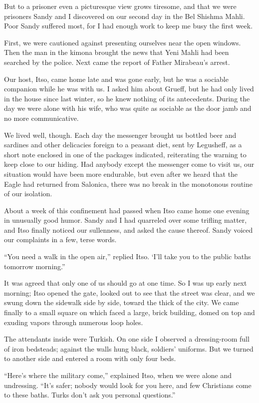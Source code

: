\documentclass[a5paper,12pt]{book}
\begin{document}
But to a prisoner even a picturesque view grows tiresome, and that we were prisoners Sandy and I discovered on our second day in the Bel Shishma Mahli. Poor Sandy suffered most, for I had enough work to keep me busy the first week.

First, we were cautioned against presenting ourselves near the open windows. Then the man in the kimona brought the news that Yeni Mahli had been searched by the police. Next came the report of Father Mirabeau’s arrest.

Our host, Itso, came home late and was gone early, but he was a sociable companion while he was with us. I asked him about Grueff, but he had only lived in the house since last winter, so he knew nothing of its antecedents. During the day we were alone with his wife, who was quite as sociable as the door jamb and no more communicative.

We lived well, though. Each day the messenger brought us bottled beer and sardines and other delicacies foreign to a peasant diet, sent by Legusheff, as a short note enclosed in one of the packages indicated, reiterating the warning to keep close to our hiding. Had anybody except the messenger come to visit us, our situation would have been more endurable, but even after we heard that the Eagle had returned from Salonica, there was no break in the monotonous routine of our isolation.

About a week of this confinement had passed when Itso came home one evening in unusually good humor. Sandy and I had quarreled over some trifling matter, and Itso finally noticed our sullenness, and asked the cause thereof. Sandy voiced our complaints in a few, terse words.

“You need a walk in the open air,” replied Itso. ‘I'll take you to the public baths tomorrow morning.”

It was agreed that only one of us should go at one time. So I was up early next morning; Itso opened the gate, looked out to see that the street was clear, and we swung down the sidewalk side by side, toward the thick of the city. We came finally to a small square on which faced a large, brick building, domed on top and exuding vapors through numerous loop holes.

The attendants inside were Turkish. On one side I observed a dressing-room full of iron bedsteads; against the walls hung black, soldiers’ uniforms. But we turned to another side and entered a room with only four beds.

“Here’s where the military come,” explained Itso, when we were alone and undressing. “It’s safer; nobody would look for you here, and few Christians come to these baths. Turks don’t ask you personal questions.”
\end{document}
